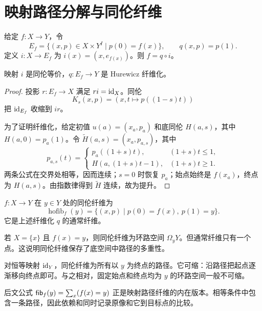 \section{映射路径分解与同伦纤维}
\begin{definition}[映射路径空间]
给定 $f:X\to Y$，令
\[
E_f=\{(x,p)\in X\times Y^I\mid p(0)=f(x)\},
\qquad q(x,p)=p(1).
\]
定义 $i:X\to E_f$ 为 $i(x)=(x,e_{f(x)})$。则 $f=q\circ i$。
\end{definition}
\begin{proposition}
映射 $i$ 是同伦等价，$q:E_f\to Y$ 是 Hurewicz 纤维化。
\end{proposition}
\begin{proof}
投影 $r:E_f\to X$ 满足 $ri=\operatorname{id}_X$。同伦
\[
K_s(x,p)=(x,t\mapsto p((1-s)t))
\]
把 $\operatorname{id}_{E_f}$ 收缩到 $ir$。

为了证明纤维化，给定初值 $u(a)=(x_a,p_a)$ 和底同伦 $H(a,s)$，其中 $H(a,0)=p_a(1)$。令 $\widetilde H(a,s)=(x_a,p_{a,s})$，其中
\[
p_{a,s}(t)=
\begin{cases}
p_a((1+s)t),&(1+s)t\le1,\\
H(a,(1+s)t-1),&(1+s)t\ge1.
\end{cases}
\]
两条公式在交界处相等，因而连续；$s=0$ 时恢复 $p_a$；始点始终是 $f(x_a)$，终点为 $H(a,s)$。由指数律得到 $\widetilde H$ 连续，故为提升。
\end{proof}
\begin{definition}[同伦纤维]
$f:X\to Y$ 在 $y\in Y$ 处的同伦纤维为
\[
\operatorname{hofib}_f(y)=\{(x,p)\mid p(0)=f(x),\ p(1)=y\}.
\]
它是上述纤维化 $q$ 的通常纤维。
\end{definition}
\begin{example}
若 $X=\{x\}$ 且 $f(x)=y$，则同伦纤维为环路空间 $\Omega_yY$。但通常纤维只有一个点。这说明同伦纤维保存了底空间中路径的多重性。
\end{example}
\begin{example}
对恒等映射 $\operatorname{id}_Y$，同伦纤维为所有以 $y$ 为终点的路径。它可缩：沿路径把起点逐渐移向终点即可。与之相对，固定始点和终点均为 $y$ 的环路空间一般不可缩。
\end{example}
\begin{remark}
后文公式 $\mathsf{fib}_f(y)=\sum_x(f(x)=y)$ 正是映射路径纤维的内在版本。相等条件中包含一条路径，因此依赖和同时记录原像和它到目标点的比较。
\end{remark}
